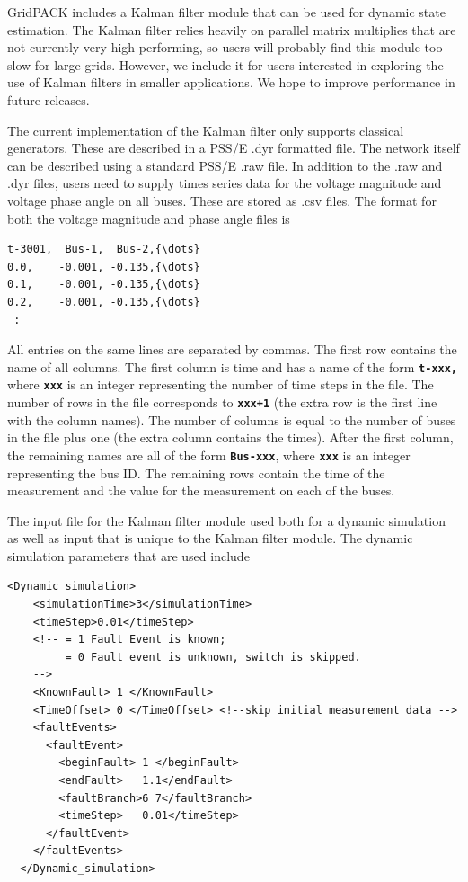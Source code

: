 \documentclass[12pt]{report} %
\begin{document}
GridPACK includes a Kalman filter module that can be used for dynamic state estimation. The Kalman filter relies heavily on parallel matrix multiplies that are not currently very high performing, so users will probably find this module too slow for large grids. However, we include it for users interested in exploring the use of Kalman filters in smaller applications. We hope to improve performance in future releases.

The current implementation of the Kalman filter only supports classical generators. These are described in a PSS/E .dyr formatted file. The network itself can be described using a standard PSS/E .raw file. In addition to the .raw and .dyr files, users need to supply times series data for the voltage magnitude and voltage phase angle on all buses. These are stored as .csv files. The format for both the voltage magnitude and phase angle files is

{
\color{red}
\begin{Verbatim}[fontseries=b]
t-3001,  Bus-1,  Bus-2,{\dots}
0.0,    -0.001, -0.135,{\dots}
0.1,    -0.001, -0.135,{\dots}
0.2,    -0.001, -0.135,{\dots}
 :
\end{Verbatim}
}

All entries on the same lines are separated by commas. The first row contains the name of all columns. The first column is time and has a name of the form \texttt{\textbf{t-xxx,}} where \texttt{\textbf{xxx}} is an integer representing the number of time steps in the file. The number of rows in the file corresponds to \texttt{\textbf{xxx+1}} (the extra row is the first line with the column names). The number of columns is equal to the number of buses in the file plus one (the extra column contains the times). After the first column, the remaining names are all of the form \texttt{\textbf{Bus-xxx}}, where \texttt{\textbf{xxx}} is an integer representing the bus ID. The remaining rows contain the time of the measurement and the value for the measurement on each of the buses.

The input file for the Kalman filter module used both for a dynamic simulation as well as input that is unique to the Kalman filter module. The dynamic simulation parameters that are used include

{
\color{blue}
\begin{Verbatim}[fontseries=b]
  <Dynamic_simulation>
    <simulationTime>3</simulationTime>
    <timeStep>0.01</timeStep>
    <!-- = 1 Fault Event is known; 
         = 0 Fault event is unknown, switch is skipped. 
    -->
    <KnownFault> 1 </KnownFault>
    <TimeOffset> 0 </TimeOffset> <!--skip initial measurement data -->
    <faultEvents>
      <faultEvent>
        <beginFault> 1 </beginFault>
        <endFault>   1.1</endFault>
        <faultBranch>6 7</faultBranch>
        <timeStep>   0.01</timeStep>
      </faultEvent>
    </faultEvents>
  </Dynamic_simulation>
\end{Verbatim}
}
\end{document}

